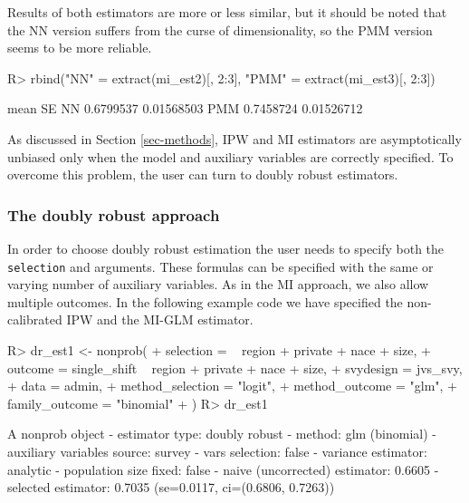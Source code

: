 \documentclass[nojss]{jss}
\begin{document}
Results of both estimators are more or less similar, but it should be
noted that the NN version suffers from the curse of dimensionality, so
the PMM version seems to be more reliable.

\begin{CodeChunk}
\begin{CodeInput}
R> rbind("NN" = extract(mi_est2)[, 2:3], "PMM" = extract(mi_est3)[, 2:3])
\end{CodeInput}
\begin{CodeOutput}
         mean         SE
NN  0.6799537 0.01568503
PMM 0.7458724 0.01526712
\end{CodeOutput}
\end{CodeChunk}

As discussed in Section \ref{sec-methods}, IPW and MI estimators are
asymptotically unbiased only when the model and auxiliary variables are
correctly specified. To overcome this problem, the user can turn to
doubly robust estimators.

\subsubsection{The doubly robust
approach}\label{the-doubly-robust-approach}

In order to choose doubly robust estimation the user needs to specify
both the \texttt{selection} and  arguments. These formulas
can be specified with the same or varying number of auxiliary variables.
As in the MI approach, we also allow multiple outcomes. In the following
example code we have specified the non-calibrated IPW and the MI-GLM
estimator.

\begin{CodeChunk}
\begin{CodeInput}
R> dr_est1 <- nonprob(
+   selection = ~ region + private + nace + size,
+   outcome = single_shift ~ region + private + nace + size,
+   svydesign = jvs_svy,
+   data = admin,
+   method_selection = "logit",
+   method_outcome = "glm",
+   family_outcome = "binomial"
+ )
R> dr_est1
\end{CodeInput}
\begin{CodeOutput}
A nonprob object
 - estimator type: doubly robust
 - method: glm (binomial)
 - auxiliary variables source: survey
 - vars selection: false
 - variance estimator: analytic
 - population size fixed: false
 - naive (uncorrected) estimator: 0.6605
 - selected estimator: 0.7035 (se=0.0117, ci=(0.6806, 0.7263))
\end{CodeOutput}
\end{CodeChunk}
\end{document}
